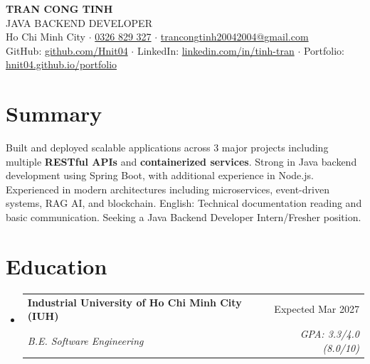 \documentclass[letterpaper,11pt]{article}
\makeatletter
\newcommand{\resumeSubheading}[4]{
  \vspace{-2pt}\item
    \begin{tabular*}{0.97\textwidth}[t]{l@{\extracolsep{\fill}}r}
      \textbf{#1} & #2 \\
      \textit{\small#3} & \textit{\small #4} \\
    \end{tabular*}\vspace{-7pt}
}
\newcommand{\resumeSubHeadingListStart}{\begin{itemize}[leftmargin=0.15in, label={}]}
\newcommand{\resumeSubHeadingListEnd}{\end{itemize}}
\makeatother
\begin{document}
\begin{center}
    {\fontsize{24pt}{28pt}\selectfont\textbf{TRAN CONG TINH}} \\ \vspace{4pt}
    {\fontsize{12pt}{14pt}\selectfont JAVA BACKEND DEVELOPER} \\ \vspace{4pt}
    \small
    Ho Chi Minh City \enspace$\cdot$\enspace
    \href{tel:+84326829327}{0326 829 327} \enspace$\cdot$\enspace
    \href{mailto:trancongtinh20042004@gmail.com}{trancongtinh20042004@gmail.com} \\[2pt]
    GitHub: \href{https://github.com/Hnit04}{github.com/Hnit04} \enspace$\cdot$\enspace
    LinkedIn: \href{https://linkedin.com/in/tinh-tran-484444408}{linkedin.com/in/tinh-tran} \enspace$\cdot$\enspace
    Portfolio: \href{https://hnit04.github.io/portfolio}{hnit04.github.io/portfolio}
\end{center}

\section{Summary}
  \small{
    Built and deployed scalable applications across 3 major projects including multiple \textbf{RESTful APIs} and \textbf{containerized services}. Strong in Java backend development using Spring Boot, with additional experience in Node.js. Experienced in modern architectures including microservices, event-driven systems, RAG AI, and blockchain. English: Technical documentation reading and basic communication. Seeking a Java Backend Developer Intern/Fresher position.
  }

\section{Education}
  \resumeSubHeadingListStart
    \resumeSubheading
      {Industrial University of Ho Chi Minh City (IUH)}{Expected Mar 2027}
      {B.E. Software Engineering}{GPA: 3.3/4.0 (8.0/10)}
  \resumeSubHeadingListEnd

\end{document}
